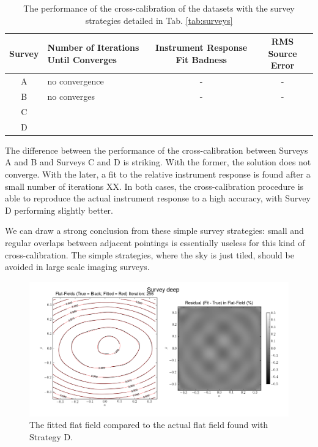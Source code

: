 \documentclass[manuscript]{aastex}
\begin{document}
\begin{table}
\begin{tabular}{|c|p{4cm}|c|c|}
\hline Survey & Number of Iterations Until Converges & Instrument Response Fit Badness & RMS Source Error \\ 
\hline A & no convergence & - & - \\ 
\hline B & no converges & - & - \\ 
\hline C &  &  &  \\ 
\hline D &  &  &  \\ 
\hline 
\end{tabular}
\caption{The performance of the cross-calibration of the datasets with the survey strategies detailed in Tab. \ref{tab:surveys}\label{fig:simple_results}}
\end{table} 

The difference between the performance of the cross-calibration between Surveys A and B and Surveys C and D is striking. With the former, the solution does not converge. With the later, a fit to the relative instrument response is found after a small number of iterations XX. In both cases, the cross-calibration procedure is able to reproduce the actual instrument response to a high accuracy, with Survey D performing slightly better. 

We can draw a strong conclusion from these simple survey strategies: small and regular overlaps between adjacent pointings is essentially useless for this kind of cross-calibration. The simple strategies, where the sky is just tiled, should be avoided in large scale imaging surveys.



\begin{figure}[ht]
\begin{center}
\includegraphics[width=\textwidth]{fit_example.png}
\end{center}
\caption{The fitted flat field compared to the actual flat field found with Strategy D. \label{fig:D}}
\end{figure}
\end{document}
